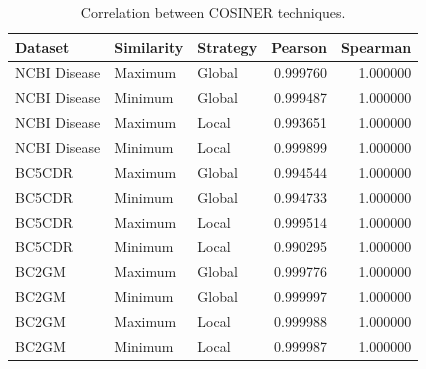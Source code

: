 \documentclass{article}
\begin{document}
\begin{table}
    \footnotesize
    \centering
    \caption{Correlation between COSINER techniques.}\begin{tabular}{lllrr}
\toprule
Dataset & Similarity & Strategy & Pearson & Spearman \\
\midrule
NCBI Disease & Maximum & Global & 0.999760 & 1.000000 \\
NCBI Disease & Minimum & Global & 0.999487 & 1.000000 \\
NCBI Disease & Maximum & Local & 0.993651 & 1.000000 \\
NCBI Disease & Minimum & Local & 0.999899 & 1.000000 \\
BC5CDR & Maximum & Global & 0.994544 & 1.000000 \\
BC5CDR & Minimum & Global & 0.994733 & 1.000000 \\
BC5CDR & Maximum & Local & 0.999514 & 1.000000 \\
BC5CDR & Minimum & Local & 0.990295 & 1.000000 \\
BC2GM & Maximum & Global & 0.999776 & 1.000000 \\
BC2GM & Minimum & Global & 0.999997 & 1.000000 \\
BC2GM & Maximum & Local & 0.999988 & 1.000000 \\
BC2GM & Minimum & Local & 0.999987 & 1.000000 \\
\bottomrule
\end{tabular}
\end{table}
\end{document}
